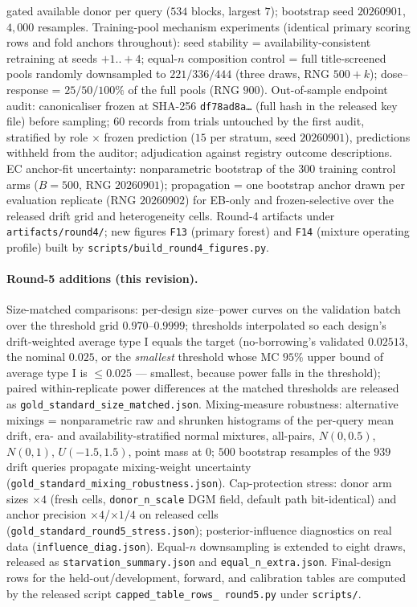 \documentclass[11pt]{article}
\begin{document}
gated available donor per query ($534$ blocks, largest $7$); bootstrap
seed $20260901$, $4{,}000$ resamples. Training-pool mechanism experiments
(identical primary scoring rows and fold anchors throughout): seed
stability = availability-consistent retraining at seeds $+1..+4$; equal-$n$
composition control = full title-screened pools randomly downsampled to
$221/336/444$ (three draws, RNG $500{+}k$); dose--response = $25/50/100\%$
of the full pools (RNG $900$). Out-of-sample endpoint audit: canonicaliser
frozen at SHA-256
\texttt{df78ad8a\ldots} (full hash in the released key file) before
sampling; $60$ records from trials untouched by the first audit, stratified
by role $\times$ frozen prediction ($15$ per stratum, seed $20260901$),
predictions withheld from the auditor; adjudication against registry
outcome descriptions. EC anchor-fit uncertainty: nonparametric bootstrap of
the $300$ training control arms ($B=500$, RNG $20260901$); propagation =
one bootstrap anchor drawn per evaluation replicate (RNG $20260902$) for
EB-only and frozen-selective over the released drift grid and
heterogeneity cells. Round-4 artifacts under
\texttt{artifacts/\allowbreak round4/}; new figures \texttt{F13} (primary
forest) and \texttt{F14} (mixture operating profile) built by
\texttt{scripts/\allowbreak build\_round4\_figures.py}.

\paragraph{Round-5 additions (this revision).} Size-matched comparisons:
per-design size--power curves on the validation batch over the threshold
grid $0.970$--$0.9999$; thresholds interpolated so each design's
drift-weighted average type I equals the target (no-borrowing's validated
$0.02513$, the nominal $0.025$, or the \emph{smallest} threshold whose MC
$95\%$
upper bound of average type I is $\le 0.025$ --- smallest, because power
falls in the threshold); paired within-replicate
power differences at the matched thresholds are released as
\texttt{gold\_standard\_\allowbreak size\_matched.json}. Mixing-measure
robustness:
alternative mixings = nonparametric raw and shrunken histograms of the
per-query mean drift, era- and availability-stratified normal mixtures,
all-pairs, $N(0,0.5)$, $N(0,1)$, $U(-1.5,1.5)$, point mass at $0$; $500$
bootstrap resamples of the $939$ drift queries propagate mixing-weight
uncertainty (\texttt{gold\_standard\_mixing\_robustness.json}).
Cap-protection stress: donor arm sizes $\times 4$ (fresh cells,
\texttt{donor\_n\_scale} DGM field, default path bit-identical) and anchor
precision $\times 4$/$\times 1/4$ on released cells
(\texttt{gold\_standard\_round5\_stress.json}); posterior-influence
diagnostics on real data (\texttt{influence\_diag.json}). Equal-$n$
downsampling is extended to eight draws, released as
\texttt{starvation\_summary.json} and
\texttt{equal\_n\_\allowbreak extra.json}.
Final-design rows for the held-out/development, forward, and calibration
tables are computed by the released script
\texttt{capped\_\allowbreak table\_\allowbreak rows\_\allowbreak
round5.py} under \texttt{scripts/}.
\end{document}

